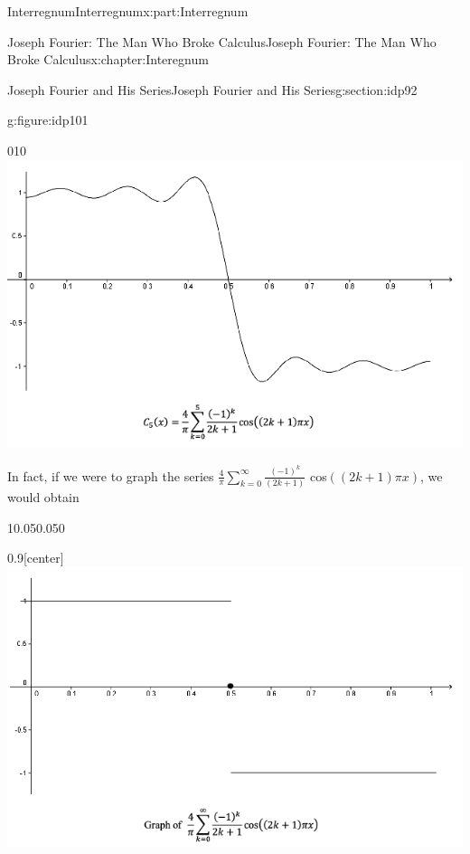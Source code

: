 \begin{partptx}{Interregnum}{}{Interregnum}{}{}{x:part:Interregnum}
\begin{chapterptx}{Joseph Fourier: The Man Who Broke Calculus}{}{Joseph Fourier: The Man Who Broke Calculus}{}{}{x:chapter:Interegnum}
\begin{sectionptx}{Joseph Fourier and His Series}{}{Joseph Fourier and His Series}{}{}{g:section:idp92}
\begin{figureptx}{}{g:figure:idp101}{}
				\centering
				\begin{image}{0}{1}{0}%
					\includegraphics[width=\linewidth]{external/images/FourierEx8.png}
				\end{image}%
				\tcblower
			\end{figureptx}%
			In fact, if we were to graph the series \(\frac{4}{\pi}\sum_{k=0}^\infty\frac{\left(-1\right)^k}{\left(2k+1\right)}\) cos\(\left(\left(2k+1\right)\pi x\right)\), we would obtain%
			\begin{sidebyside}{1}{0.05}{0.05}{0}%
				\begin{sbspanel}{0.9}[center]%
					\includegraphics[width=\linewidth]{external/images/FourierEx10.png}
				\end{sbspanel}%
			\end{sidebyside}%
			\par

\end{sectionptx}
\end{chapterptx}
\end{partptx}
